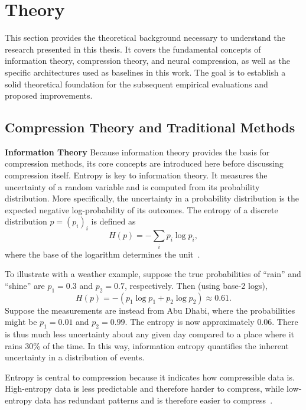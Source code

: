 \chapter{Theory}
\label{chap:theory}

This section provides the theoretical background necessary to understand the research presented in this thesis. It covers the fundamental concepts of information theory, compression theory, and neural compression, as well as the specific architectures used as baselines in this work. The goal is to establish a solid theoretical foundation for the subsequent empirical evaluations and proposed improvements.

\section{Compression Theory and Traditional Methods}

\textbf{Information Theory} Because information theory provides the basis for compression methods, its core concepts are introduced here before discussing compression itself. Entropy is key to information theory. It measures the uncertainty of a random variable and is computed from its probability distribution. More specifically, the uncertainty in a probability distribution is the expected negative log-probability of its outcomes. The entropy of a discrete distribution $p = {(p_i)}_i$ is defined as
\begin{equation}
H(p) = -\sum_i p_i \log p_i,
\end{equation}
where the base of the logarithm determines the unit~\cite{Shannon1948}.

To illustrate with a weather example, suppose the true probabilities of ``rain'' and ``shine'' are $p_1 = 0.3$ and $p_2 = 0.7$, respectively. Then (using base-2 logs),
\begin{equation}
H(p) = -(p_1 \log p_1 + p_2 \log p_2) \approx 0.61.
\end{equation}
Suppose the measurements are instead from Abu Dhabi, where the probabilities might be $p_1 = 0.01$ and $p_2 = 0.99$. The entropy is now approximately $0.06$. There is thus much less uncertainty about any given day compared to a place where it rains 30\% of the time. In this way, information entropy quantifies the inherent uncertainty in a distribution of events.

Entropy is central to compression because it indicates how compressible data is. High-entropy data is less predictable and therefore harder to compress, while low-entropy data has redundant patterns and is therefore easier to compress~\cite{Shannon1948}.

